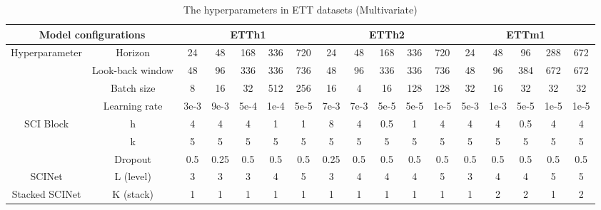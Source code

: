 \documentclass{article}
\begin{document}
\begin{table*}[h]
\centering
\caption{The hyperparameters in ETT datasets (Multivariate)}
\resizebox{\textwidth}{!}
{
\begin{tabular}{c|c|c|c|c|c|c|c|c|c|c|c|c|c|c|c|c}
\hline
\multicolumn{2}{c|}{Model configurations}          & \multicolumn{5}{c|}{ETTh1}       & \multicolumn{5}{c|}{ETTh2}       & \multicolumn{5}{c}{ETTm1}       \\ \hline
\multirow{4}{*}{Hyperparameter} & Horizon          & 24   & 48   & 168  & 336  & 720  & 24   & 48   & 168  & 336  & 720  & 24   & 48   & 96   & 288  & 672  \\ \cline{2-17} 
                                & Look-back window & 48   & 96   & 336  & 336  & 736  & 48   & 96   & 336  & 336  & 736  & 48   & 96   & 384  & 672  & 672  \\ \cline{2-17} 
                                & Batch size       & 8    & 16   & 32   & 512  & 256  & 16   & 4    & 16   & 128  & 128  & 32   & 16   & 32   & 32   & 32   \\ \cline{2-17} 
                                & Learning rate    & 3e-3 & 9e-3 & 5e-4 & 1e-4 & 5e-5 & 7e-3 & 7e-3 & 5e-5 & 5e-5 & 1e-5 & 5e-3 & 1e-3 & 5e-5 & 1e-5 & 1e-5 \\ \hline
\multirow{3}{*}{SCI Block}      & h                & 4    & 4    & 4    & 1    & 1    & 8    & 4    & 0.5  & 1    & 4    & 4    & 4    & 0.5  & 4    & 4    \\ \cline{2-17} 
                                & k                & 5    & 5    & 5    & 5    & 5    & 5    & 5    & 5    & 5    & 5    & 5    & 5    & 5    & 5    & 5    \\ \cline{2-17}
                                & Dropout          & 0.5  & 0.25 & 0.5  & 0.5  & 0.5  & 0.25 & 0.5  & 0.5  & 0.5  & 0.5  & 0.5  & 0.5  & 0.5  & 0.5  & 0.5    \\ \hline
SCINet                          & L (level)        & 3    & 3    & 3    & 4    & 5    & 3    & 4    & 4    & 4    & 5    & 3    & 4    & 4    & 5    & 5    \\ \hline
Stacked SCINet                  & K (stack)        & 1    & 1    & 1    & 1    & 1    & 1    & 1    & 1    & 1    & 1    & 1    & 2    & 2    & 1    & 2    \\ \hline
\end{tabular}}
\label{tab:hetth}
\vspace{-8pt}
\end{table*}
\end{document}
